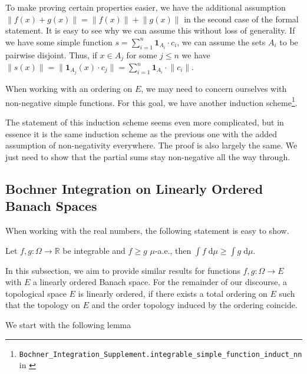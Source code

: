 \begin{remark}
To make proving certain properties easier, we have the additional assumption $\lVert f(x) + g(x) \rVert = \lVert f(x) \rVert + \lVert g(x) \rVert$ in the second case of the formal statement. It is easy to see why we can assume this without loss of generality. If we have some simple function $s = \sum_{i=1}^n \mathbf{1}_{A_i} \cdot c_i$, we can assume the sets $A_i$ to be pairwise disjoint. Thus, if $x \in A_j$ for some $j \le n$ we have $\lVert s(x) \rVert = \lVert \mathbf{1}_{A_j}(x) \cdot c_j\rVert = \sum_{i=1}^n \mathbf{1}_{A_i} \cdot \lVert c_i \rVert$.
\end{remark}

When working with an ordering on $E$, we may need to concern ourselves with non-negative simple functions. For this goal, we have another induction scheme\footnote{\texttt{Bochner\_Integration\_Supplement.integrable\_simple\_function\_induct\_nn} in \cite{Keskin_A_Formalization_of_2023}}.\label{ind:simple_nn}

The statement of this induction scheme seems even more complicated, but in essence it is the same induction scheme as the previous one with the added assumption of non-negativity everywhere. The proof is also largely the same. We just need to show that the partial sums stay non-negative all the way through.

\pagebreak
\subsection{Bochner Integration on Linearly Ordered Banach Spaces}

When working with the real numbers, the following statement is easy to show.
\begin{center}
Let $f, g : \Omega \rightarrow \mathbb{R}$ be integrable and $f \ge g$ $\mu$-a.e., then $\int f\;\textrm{d} \mu \ge \int g\;\textrm{d} \mu$. 
\end{center}
In this subsection, we aim to provide similar results for functions $f, g : \Omega \rightarrow E$ with $E$ a linearly ordered Banach space. For the remainder of our discourse, a topological space $E$ is linearly ordered, if there exists a total ordering on $E$ such that the topology on $E$ and the order topology induced by the ordering coincide.

We start with the following lemma

